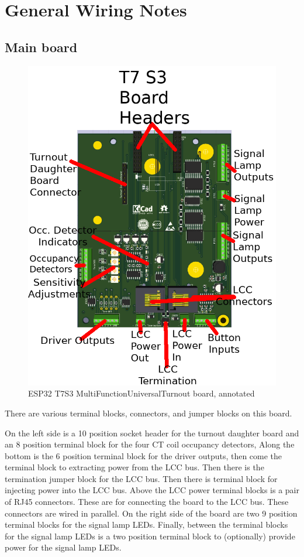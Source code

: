 \documentclass[12pt,twoside]{article}
\begin{document}
\section{General Wiring Notes}

\subsection{Main board}
\begin{figure}[hbpt]\begin{centering}%
\includegraphics[width=5in]{ESP32-T7S3-MultiFunctionUniversalTurnout-Annotated.png}
\caption{ESP32 T7S3 MultiFunctionUniversalTurnout board, annotated}
\end{centering}\end{figure}

There are various terminal blocks, connectors, and jumper blocks on this
board.  

On the left side is a 10 position socket header for the turnout daughter board
and an 8 position terminal block for the four CT coil occupancy detectors,
Along the bottom is the 6 position terminal block for the driver outputs, then
come the terminal block to extracting power from the LCC bus. Then there is
the termination jumper block for the LCC bus. Then there is terminal block for
injecting power into the LCC bus. Above the LCC power terminal blocks is a
pair of RJ45 connectors. These are for connecting the board to the LCC bus.
These connectors are wired in parallel. On the right side of the board are two
9 position terminal blocks for the signal lamp LEDs. Finally, between the
terminal blocks for the signal lamp LEDs is a two position terminal block to
(optionally) provide power for the signal lamp LEDs.
\end{document}
